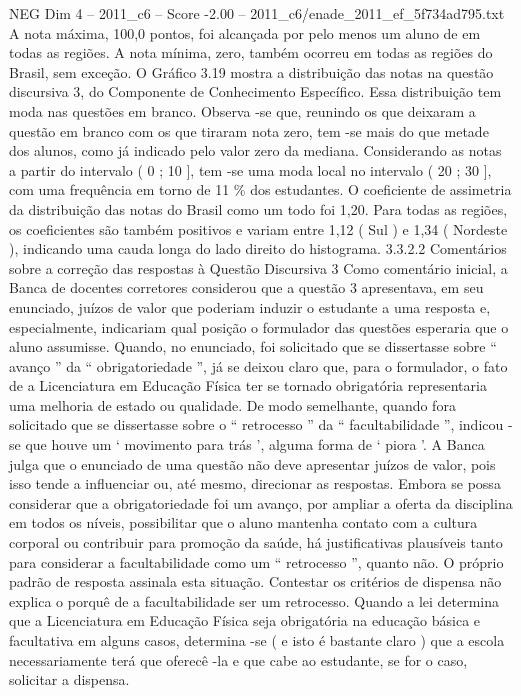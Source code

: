 \begin{textsample}{NEG Dim 4 – 2011\_c6 – Score -2.00 – 2011\_c6/enade\_2011\_ef\_5f734ad795.txt}
A nota máxima, 100,0 pontos, foi alcançada por pelo menos um aluno de em todas as regiões.
A nota mínima, zero, também ocorreu em todas as regiões do Brasil, sem exceção.
O Gráfico 3.19 mostra a distribuição das notas na questão discursiva 3, do Componente de Conhecimento Específico.
Essa distribuição tem moda nas questões em branco.
Observa -se que, reunindo os que deixaram a questão em branco com os que tiraram nota zero, tem -se mais do que metade dos alunos, como já indicado pelo valor zero da mediana.
Considerando as notas a partir do intervalo ( 0 ; 10 ], tem -se uma moda local no intervalo ( 20 ; 30 ], com uma frequência em torno de 11 \% dos estudantes.
O coeficiente de assimetria da distribuição das notas do Brasil como um todo foi 1,20.
Para todas as regiões, os coeficientes são também positivos e variam entre 1,12 ( Sul ) e 1,34 ( Nordeste ), indicando uma cauda longa do lado direito do histograma. 3.3.2.2 Comentários sobre a correção das respostas à Questão Discursiva 3 Como comentário inicial, a Banca de docentes corretores considerou que a questão 3 apresentava, em seu enunciado, juízos de valor que poderiam induzir o estudante a uma resposta e, especialmente, indicariam qual posição o formulador das questões esperaria que o aluno assumisse.
Quando, no enunciado, foi solicitado que se dissertasse sobre “ avanço ” da “ obrigatoriedade ”, já se deixou claro que, para o formulador, o fato de a Licenciatura em Educação Física ter se tornado obrigatória representaria uma melhoria de estado ou qualidade.
De modo semelhante, quando fora solicitado que se dissertasse sobre o “ retrocesso ” da “ facultabilidade ”, indicou -se que houve um ‘ movimento para trás ’, alguma forma de ‘ piora ’.
A Banca julga que o enunciado de uma questão não deve apresentar juízos de valor, pois isso tende a influenciar ou, até mesmo, direcionar as respostas.
Embora se possa considerar que a obrigatoriedade foi um avanço, por ampliar a oferta da disciplina em todos os níveis, possibilitar que o aluno mantenha contato com a cultura corporal ou contribuir para promoção da saúde, há justificativas plausíveis tanto para considerar a facultabilidade como um “ retrocesso ”, quanto não.
O próprio padrão de resposta assinala esta situação.
Contestar os critérios de dispensa não explica o porquê de a facultabilidade ser um retrocesso.
Quando a lei determina que a Licenciatura em Educação Física seja obrigatória na educação básica e facultativa em alguns casos, determina -se ( e isto é bastante claro ) que a escola necessariamente terá que oferecê -la e que cabe ao estudante, se for o caso, solicitar a dispensa.

\end{textsample}
